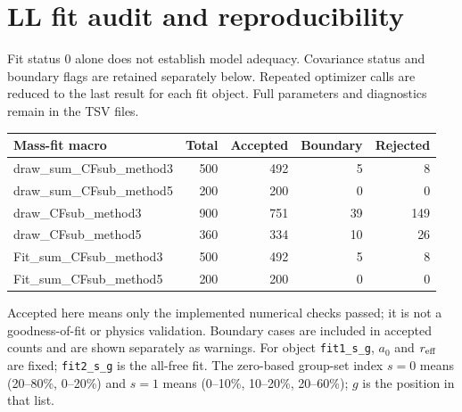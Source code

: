 \documentclass[11pt,a4paper]{article}
\begin{document}
\clearpage\section{LL fit audit and reproducibility}
Fit status 0 alone does not establish model adequacy. Covariance status and boundary flags are retained separately below. Repeated optimizer calls are reduced to the last result for each fit object. Full parameters and diagnostics remain in the TSV files.
{\small\begin{longtable}{lrrrr}\hline Mass-fit macro & Total & Accepted & Boundary & Rejected\\\hline\endhead
draw\_sum\_CFsub\_method3 & 500 & 492 & 5 & 8\\
draw\_sum\_CFsub\_method5 & 200 & 200 & 0 & 0\\
draw\_CFsub\_method3 & 900 & 751 & 39 & 149\\
draw\_CFsub\_method5 & 360 & 334 & 10 & 26\\
Fit\_sum\_CFsub\_method3 & 500 & 492 & 5 & 8\\
Fit\_sum\_CFsub\_method5 & 200 & 200 & 0 & 0\\
\hline\end{longtable}}
Accepted here means only the implemented numerical checks passed; it is not a goodness-of-fit or physics validation. Boundary cases are included in accepted counts and are shown separately as warnings.
For object \texttt{fit1\_s\_g}, $a_0$ and $r_{\rm eff}$ are fixed; \texttt{fit2\_s\_g} is the all-free fit. The zero-based group-set index $s=0$ means (20--80\%, 0--20\%) and $s=1$ means (0--10\%, 10--20\%, 20--60\%); $g$ is the position in that list.
\end{document}
